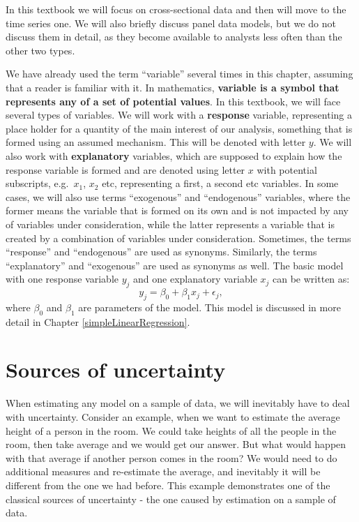 \documentclass[
]{book}
\theoremstyle{definition}
\theoremstyle{definition}
\theoremstyle{definition}
\theoremstyle{definition}
\theoremstyle{remark}
\begin{document}
In this textbook we will focus on cross-sectional data and then will move to the time series one. We will also briefly discuss panel data models, but we do not discuss them in detail, as they become available to analysts less often than the other two types.

We have already used the term ``variable'' several times in this chapter, assuming that a reader is familiar with it. In mathematics, \textbf{variable is a symbol that represents any of a set of potential values}. In this textbook, we will face several types of variables. We will work with a \textbf{response} variable, representing a place holder for a quantity of the main interest of our analysis, something that is formed using an assumed mechanism. This will be denoted with letter \(y\). We will also work with \textbf{explanatory} variables, which are supposed to explain how the response variable is formed and are denoted using letter \(x\) with potential subscripts, e.g.~\(x_1\), \(x_2\) etc, representing a first, a second etc variables. In some cases, we will also use terms ``exogenous'' and ``endogenous'' variables, where the former means the variable that is formed on its own and is not impacted by any of variables under consideration, while the latter represents a variable that is created by a combination of variables under consideration. Sometimes, the terms ``response'' and ``endogenous'' are used as synonyms. Similarly, the terms ``explanatory'' and ``exogenous'' are used as synonyms as well. The basic model with one response variable \(y_j\) and one explanatory variable \(x_j\) can be written as:
\begin{equation*}
    y_j = \beta_0 + \beta_1 x_j + \epsilon_j ,
\end{equation*}
where \(\beta_0\) and \(\beta_1\) are parameters of the model. This model is discussed in more detail in Chapter \ref{simpleLinearRegression}.

\section{Sources of uncertainty}\label{sourcesOfUncertainty}

When estimating any model on a sample of data, we will inevitably have to deal with uncertainty. Consider an example, when we want to estimate the average height of a person in the room. We could take heights of all the people in the room, then take average and we would get our answer. But what would happen with that average if another person comes in the room? We would need to do additional measures and re-estimate the average, and inevitably it will be different from the one we had before. This example demonstrates one of the classical sources of uncertainty - the one caused by estimation on a sample of data.
\end{document}
